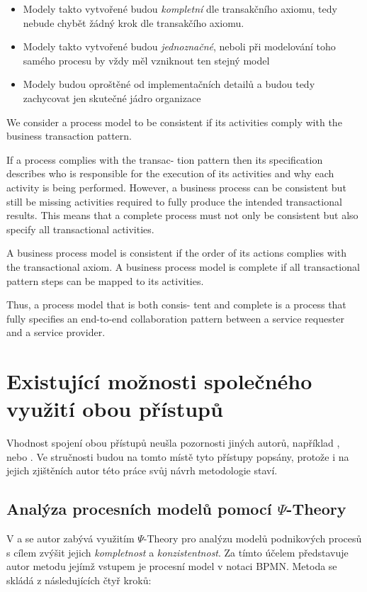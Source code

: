 \documentclass[]{article}
\begin{document}
\begin{itemize}
\item Modely takto vytvořené budou \textit{kompletní} dle transakčního axiomu, tedy nebude chybět žádný krok dle transakčího axiomu. %
\item Modely takto vytvořené budou \textit{jednoznačné}, neboli při modelování toho samého procesu by vždy měl vzniknout ten stejný model
\item Modely budou oproštěné od implementačních detailů a budou tedy zachycovat jen skutečné jádro organizace
\end{itemize}

We consider a process model to be consistent if its activities comply with the business transaction pattern. 

If a process complies with the transac- tion pattern then its specification describes who is responsible for the execution of its activities and why each activity is being performed. However, a business process can be consistent but still be missing activities required to fully produce the intended transactional results. This means that a complete process must not only be consistent but also specify all transactional activities.

A business process model is consistent if the order of its actions complies with the transactional axiom. A business process model is complete if all transactional pattern steps can be mapped to its activities.

Thus, a process model that is both consis- tent and complete is a process that fully specifies an end-to-end collaboration pattern between a service requester and a service provider.


\section{Existující možnosti společného využití obou přístupů} \label{sec:existujici_moznosti}
Vhodnost spojení obou přístupů neušla pozornosti jiných autorů, například \cite{VanNuffel2009}, \cite{Caetano2011} nebo \cite{Caetano2012}. Ve stručnosti budou na tomto místě tyto přístupy popsány, protože i na jejich zjištěních autor této práce svůj návrh metodologie staví.

\subsection{Analýza procesních modelů pomocí $\Psi$-Theory} \label{sec:analyza_proc_modelu_psi}
V \cite{Caetano2012} a \cite{Caetano2011} se autor zabývá využitím $\Psi$-Theory pro analýzu modelů podnikových procesů s cílem zvýšit jejich \textit{kompletnost} a \textit{konzistentnost}. Za tímto účelem představuje autor metodu jejímž vstupem je procesní model v notaci BPMN. Metoda se skládá z následujících čtyř kroků:
\end{document}

